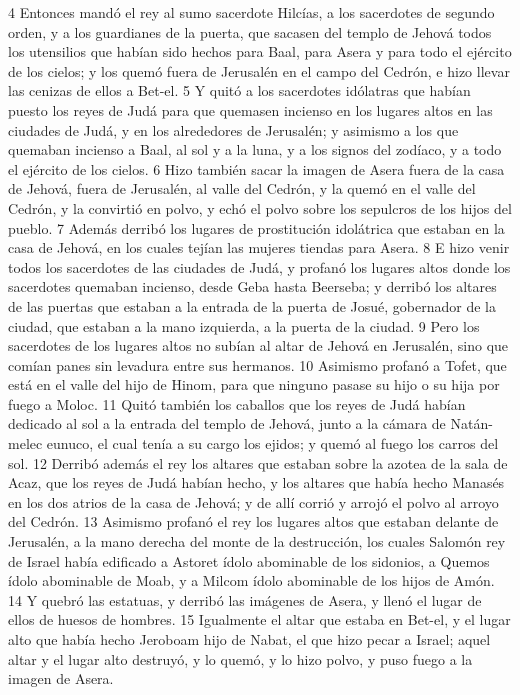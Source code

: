 4 Entonces mandó el rey al sumo sacerdote Hilcías, a los sacerdotes de segundo orden, y a los guardianes de la puerta, que sacasen del templo de Jehová todos los utensilios que habían sido hechos para Baal, para Asera y para todo el ejército de los cielos; y los quemó fuera de Jerusalén en el campo del Cedrón, e hizo llevar las cenizas de ellos a Bet-el.
5 Y quitó a los sacerdotes idólatras que habían puesto los reyes de Judá para que quemasen incienso en los lugares altos en las ciudades de Judá, y en los alrededores de Jerusalén; y asimismo a los que quemaban incienso a Baal, al sol y a la luna, y a los signos del zodíaco, y a todo el ejército de los cielos. 
6 Hizo también sacar la imagen de Asera fuera de la casa de Jehová, fuera de Jerusalén, al valle del Cedrón, y la quemó en el valle del Cedrón, y la convirtió en polvo, y echó el polvo sobre los sepulcros de los hijos del pueblo. 
7 Además derribó los lugares de prostitución idolátrica que estaban en la casa de Jehová, en los cuales tejían las mujeres tiendas para Asera.
8 E hizo venir todos los sacerdotes de las ciudades de Judá, y profanó los lugares altos donde los sacerdotes quemaban incienso, desde Geba hasta Beerseba; y derribó los altares de las puertas que estaban a la entrada de la puerta de Josué, gobernador de la ciudad, que estaban a la mano izquierda, a la puerta de la ciudad.
9 Pero los sacerdotes de los lugares altos no subían al altar de Jehová en Jerusalén, sino que comían panes sin levadura entre sus hermanos.
10 Asimismo profanó a Tofet, que está en el valle del hijo de Hinom, para que ninguno pasase su hijo o su hija por fuego a Moloc. 
11 Quitó también los caballos que los reyes de Judá habían dedicado al sol a la entrada del templo de Jehová, junto a la cámara de Natán-melec eunuco, el cual tenía a su cargo los ejidos; y quemó al fuego los carros del sol.
12 Derribó además el rey los altares que estaban sobre la azotea de la sala de Acaz, que los reyes de Judá habían hecho, y los altares que había hecho Manasés en los dos atrios de la casa de Jehová; y de allí corrió y arrojó el polvo al arroyo del Cedrón.
13 Asimismo profanó el rey los lugares altos que estaban delante de Jerusalén, a la mano derecha del monte de la destrucción, los cuales Salomón rey de Israel había edificado a Astoret ídolo abominable de los sidonios, a Quemos ídolo abominable de Moab, y a Milcom ídolo abominable de los hijos de Amón. 
14 Y quebró las estatuas, y derribó las imágenes de Asera, y llenó el lugar de ellos de huesos de hombres.
15 Igualmente el altar que estaba en Bet-el, y el lugar alto que había hecho Jeroboam hijo de Nabat, el que hizo pecar a Israel; aquel altar y el lugar alto destruyó, y lo quemó, y lo hizo polvo, y puso fuego a la imagen de Asera.
